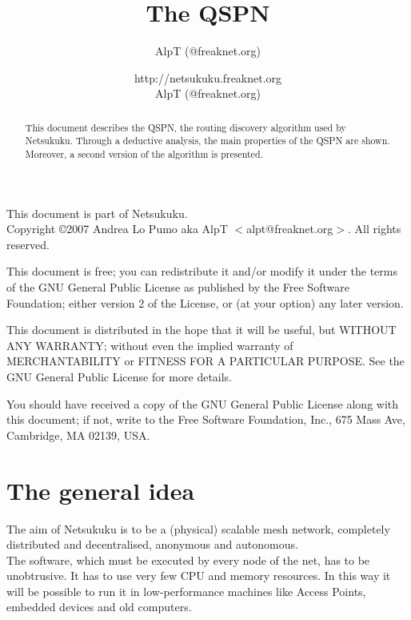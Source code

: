 \documentclass[a4paper]{article}
\title{The QSPN}
\author{AlpT (@freaknet.org)}
\author{http://netsukuku.freaknet.org\\AlpT (@freaknet.org)}
\begin{document}
\maketitle

\begin{abstract}
	This document describes the QSPN, the routing discovery algorithm used
	by Netsukuku.
	Through a deductive analysis, the main properties of the QSPN are
	shown. Moreover, a second version of the algorithm is presented.
\end{abstract}
\pagebreak
\begin{small}
  This document is part of Netsukuku.\\
  Copyright \copyright 2007 Andrea Lo Pumo aka AlpT $<$alpt@freaknet.org$>$.
  All rights reserved.

  This document is free; you can redistribute it and/or modify it
  under the terms of the GNU General Public License as published by
  the Free Software Foundation; either version 2 of the License, or
  (at your option) any later version.

  This document is distributed in the hope that it will be useful, but
  WITHOUT ANY WARRANTY; without even the implied warranty of
  MERCHANTABILITY or FITNESS FOR A PARTICULAR PURPOSE\@.  See the GNU
  General Public License for more details.

  You should have received a copy of the GNU General Public License
  along with this document; if not, write to the Free Software
  Foundation, Inc., 675 Mass Ave, Cambridge, MA 02139, USA.
\end{small}

\clearpage
\tableofcontents
\clearpage
{}

\section{The general idea}
\label{sec:general_idea}

The aim of Netsukuku is to be a (physical) scalable mesh network, completely
distributed and decentralised, anonymous and autonomous.\\

The software, which must be executed by every node of the net, has to be
unobtrusive. It has to use very few CPU and memory resources. In this way it
will be possible to run it in low-performance machines like Access Points,
embedded devices and old computers.\\
\end{document}
